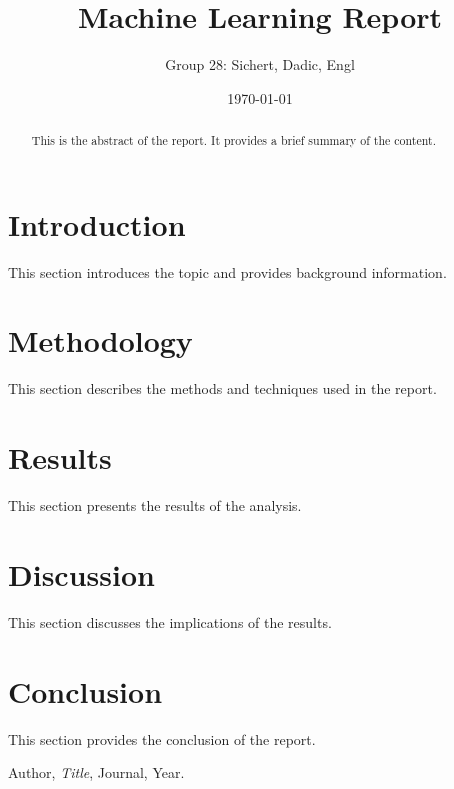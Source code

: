 \documentclass[a4paper,12pt]{article}
\title{Machine Learning Report}
\author{Group 28: Sichert, Dadic, Engl}
\date{\today}
\begin{document}
\maketitle

\begin{abstract}
This is the abstract of the report. It provides a brief summary of the content.
\end{abstract}

\tableofcontents

\section{Introduction}
This section introduces the topic and provides background information.

\section{Methodology}
This section describes the methods and techniques used in the report.

\section{Results}
This section presents the results of the analysis.

\section{Discussion}
This section discusses the implications of the results.

\section{Conclusion}
This section provides the conclusion of the report.

\begin{thebibliography}{9}
Author, \textit{Title}, Journal, Year.
\end{thebibliography}
\end{document}
